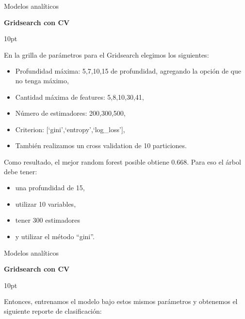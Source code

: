 \documentclass[pdf]{beamer}
\def\vspace{}%
\begin{document}
{\begin{frame}{Modelos analíticos}

    \begin{Large}
        \textbf{Gridsearch con CV}
    \end{Large}
    \vspace{10pt}

    En la grilla de parámetros para el Gridsearch elegimos los siguientes:
    \begin{itemize}
        \item Profundidad máxima: 5,7,10,15 de profundidad, agregando la opción de que no tenga máximo,
        \item Cantidad máxima de features: 5,8,10,30,41,
        \item Número de estimadores: 200,300,500,
        \item Criterion: [`gini',`entropy',`log\_loss'],
        \item También realizamos un cross validation de 10 particiones.
    \end{itemize}
    
    Como resultado, el mejor random forest posible obtiene 0.668. Para eso el árbol debe tener: 
    \begin{itemize}
        \item una profundidad de 15, 
        \item utilizar  10  variables, 
        \item tener  300  estimadores 
        \item y utilizar el método ``gini''.
    \end{itemize}

\end{frame}

\begin{frame}{Modelos analíticos}    

    \begin{Large}
        \textbf{Gridsearch con CV}
    \end{Large}
    \vspace{10pt}

    Entonces, entrenamos el modelo bajo estos mismos parámetros y obtenemos el siguiente reporte de clasificación:
    

\end{frame}}
\end{document}
